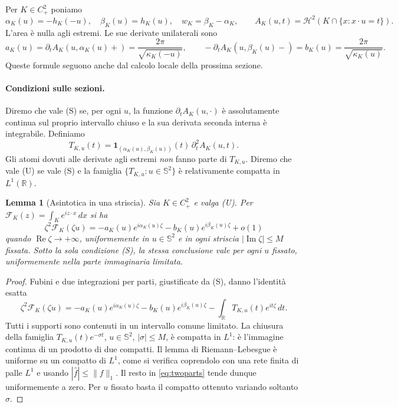 \documentclass[11pt,a4paper]{article}
\newtheorem{lemma}[theorem]{Lemma}
\theoremstyle{remark}
\newcommand{\R}{\mathbb R}
\newcommand{\Sph}{\mathbb S^2}
\newcommand{\ind}{\mathbf 1}
\begin{document}
Per $K\in C^2_+$ poniamo
\[
\alpha_K(u)=-h_K(-u),\quad \beta_K(u)=h_K(u),\quad
w_K=\beta_K-\alpha_K,
\qquad A_K(u,t)=\mathcal H^2(K\cap\{x:x\cdot u=t\}).
\]
L'area è nulla agli estremi. Le sue derivate unilaterali sono
\begin{equation}\label{eq:slopes}
a_K(u)=\partial_t A_K(u,\alpha_K(u)+)
=\frac{2\pi}{\sqrt{\kappa_K(-u)}},\qquad
-\partial_t A_K(u,\beta_K(u)-)=b_K(u)
=\frac{2\pi}{\sqrt{\kappa_K(u)}}.
\end{equation}
Queste formule seguono anche dal calcolo locale della prossima sezione.

\paragraph{Condizioni sulle sezioni.}
Diremo che vale (S) se, per ogni $u$, la funzione
$\partial_t A_K(u,\cdot)$ è assolutamente continua sul proprio intervallo
chiuso e la sua derivata seconda interna è integrabile. Definiamo
\[
T_{K,u}(t)=\ind_{(\alpha_K(u),\beta_K(u))}(t)\,
\partial_t^2 A_K(u,t).
\]
Gli atomi dovuti alle derivate agli estremi \emph{non} fanno parte di
$T_{K,u}$. Diremo che vale (U) se vale (S) e la famiglia
$\{T_{K,u}:u\in\Sph\}$ è relativamente compatta in $L^1(\R)$.

\begin{lemma}[Asintotica in una striscia]\label{lem:strip}
Sia $K\in C^2_+$ e valga (U). Per
$\mathcal F_K(z)=\int_K e^{iz\cdot x}\,dx$ si ha
\begin{equation}\label{eq:strip}
\zeta^2\mathcal F_K(\zeta u)=
-a_K(u)e^{i\alpha_K(u)\zeta}-b_K(u)e^{i\beta_K(u)\zeta}+o(1)
\end{equation}
quando $\operatorname{Re}\zeta\to+\infty$, uniformemente in $u\in\Sph$
e in ogni striscia $|\operatorname{Im}\zeta|\leq M$ fissata.
Sotto la sola condizione (S), la stessa conclusione vale per ogni $u$
fissato, uniformemente nella parte immaginaria limitata.
\end{lemma}
\begin{proof}
Fubini e due integrazioni per parti, giustificate da (S), danno l'identità
esatta
\begin{equation}\label{eq:twoparts}
\zeta^2\mathcal F_K(\zeta u)=
-a_K(u)e^{i\alpha_K(u)\zeta}-b_K(u)e^{i\beta_K(u)\zeta}
-\int_\R T_{K,u}(t)e^{it\zeta}\,dt.
\end{equation}
Tutti i supporti sono contenuti in un intervallo comune limitato.
La chiusura della famiglia
$T_{K,u}(t)e^{-\sigma t}$, $u\in\Sph$, $|\sigma|\leq M$, è compatta
in $L^1$: è l'immagine continua di un prodotto di due compatti.
Il lemma di Riemann--Lebesgue è uniforme su un compatto di $L^1$,
come si verifica coprendolo con una rete finita di palle $L^1$ e usando
$|\widehat f|\leq\|f\|_1$. Il resto in \eqref{eq:twoparts} tende dunque
uniformemente a zero. Per $u$ fissato basta il compatto ottenuto variando
soltanto $\sigma$.
\end{proof}
\end{document}
